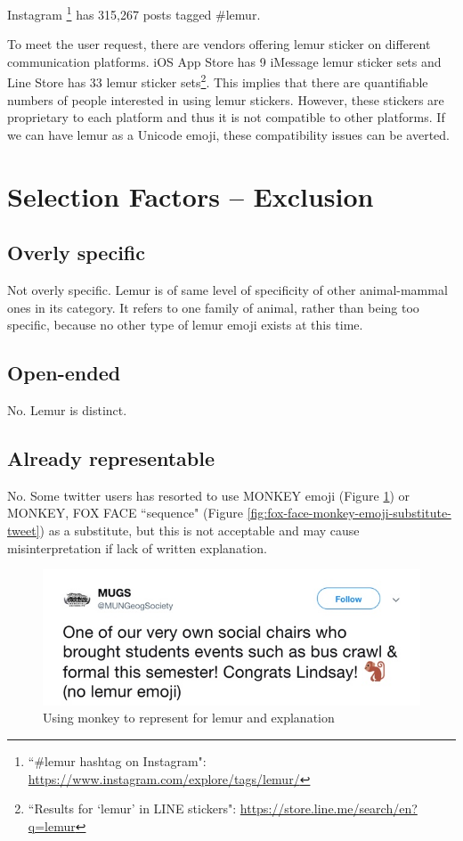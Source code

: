 \documentclass{article}
\begin{document}
Instagram \footnote{``\#lemur hashtag on Instagram": \url{https://www.instagram.com/explore/tags/lemur/}} has 315,267 posts tagged \#lemur.

To meet the user request, there are vendors offering lemur sticker on different communication platforms. iOS App Store has 9 iMessage lemur sticker sets and Line Store has 33 lemur sticker sets\footnote{``Results for `lemur' in LINE stickers": \url{https://store.line.me/search/en?q=lemur}}. This implies that there are quantifiable numbers of people interested in using lemur stickers. However, these stickers are proprietary to each platform and thus it is not compatible to other platforms. If we can have lemur as a Unicode emoji, these compatibility issues can be averted.

\section{Selection Factors -- Exclusion}
\subsection{Overly specific}
Not overly specific. Lemur is of same level of specificity of other animal-mammal ones in its category. It refers to one family of animal, rather
than being too specific, because no other type of lemur emoji exists at this time.

\subsection{Open-ended}
No. Lemur is distinct.

\subsection{Already representable}
No. Some twitter users has resorted to use MONKEY emoji (Figure \ref{fig:monkey-emoji-substitute-tweet}) or MONKEY, FOX FACE ``sequence" (Figure \ref{fig:fox-face-monkey-emoji-substitute-tweet}) as a substitute, but this is not acceptable and may cause misinterpretation if lack of written explanation.

\begin{figure}
  \includegraphics[width=\linewidth]{img/monkey-emoji-substitute-tweet.jpg}
  \caption{Using monkey to represent for lemur and explanation\protect\footnotemark}
  \label{fig:monkey-emoji-substitute-tweet}
\end{figure}
\end{document}
